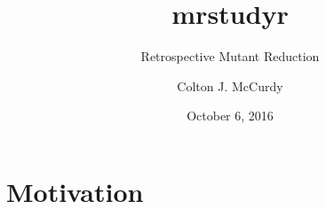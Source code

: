 \documentclass[hyperref]{beamer}
\title{mrstudyr}
\subtitle{Retrospective Mutant Reduction}
\author[McCurdy]{Colton J. McCurdy}
\institute[ICSME 2016]{ICSME 2016}
\date[October 6, 2016]{October 6, 2016}
\begin{document}
\begin{frame}
  \titlepage
\end{frame}

\section{Motivation}

%
% 
%
% 
%
% 
%
% 
%
% 
\end{document}
